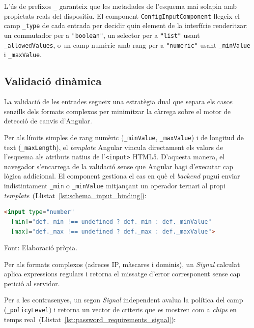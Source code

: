 \medskip
L'ús de prefixos \texttt{\_} garanteix que les metadades de l'esquema mai solapin amb propietats reals del dispositiu. El component \texttt{ConfigInputComponent} llegeix el camp \texttt{\_type} de cada entrada per decidir quin element de la interfície renderitzar: un commutador per a \texttt{"boolean"}, un selector per a \texttt{"list"} usant \texttt{\_allowedValues}, o un camp numèric amb rang per a \texttt{"numeric"} usant \texttt{\_minValue} i \texttt{\_maxValue}.

\subsection{Validació dinàmica}
La validació de les entrades segueix una estratègia dual que separa els casos senzills dels formats complexos per minimitzar la càrrega sobre el motor de detecció de canvis d'Angular.

Per als límits simples de rang numèric (\texttt{\_minValue}, \texttt{\_maxValue}) i de longitud de text (\texttt{\_maxLength}), el \textit{template} Angular vincula directament els valors de l'esquema als atributs natius de l'\texttt{<input>} HTML5. D'aquesta manera, el navegador s'encarrega de la validació sense que Angular hagi d'executar cap lògica addicional. El component gestiona el cas en què el \textit{backend} pugui enviar indistintament \texttt{\_min} o \texttt{\_minValue} mitjançant un operador ternari al propi \textit{template}~(Llistat~\ref{lst:schema_input_binding}):

\begin{lstlisting}[basicstyle=\footnotesize, language=HTML, label={lst:schema_input_binding}, caption={Vinculaci\'o de les restriccions num\`eriques de l'esquema als atributs natius de l'\textit{input} HTML5.}]
<input type="number"
  [min]="def._min !== undefined ? def._min : def._minValue"
  [max]="def._max !== undefined ? def._max : def._maxValue">
\end{lstlisting}
\smallskip\par{\small\noindent Font: Elaboració pròpia.}

\medskip
Per als formats complexos (adreces IP, màscares i dominis), un \textit{Signal} calculat aplica expressions regulars i retorna el missatge d'error corresponent sense cap petició al servidor.

Per a les contrasenyes, un segon \textit{Signal} independent avalua la política del camp (\texttt{\_policyLevel}) i retorna un vector de criteris que es mostren com a \textit{chips} en temps real~(Llistat~\ref{lst:password_requirements_signal}):

